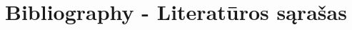 %
%
%


\chapter*{Bibliography - Literatūros sąrašas}
\label{cha:bibliography}
	

\pagestyle{plain}

